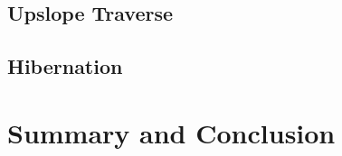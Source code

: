 



\subsection{Upslope Traverse}
\label{sec:PowerBudget:PowerBudget:UpslopeTraverse}

\subsection{Hibernation}
\label{sec:PowerBudget:PowerBudget:Hibernation}

\section{Summary and Conclusion}
\label{sec:PowerBudget:SummaryAndConclusion}
